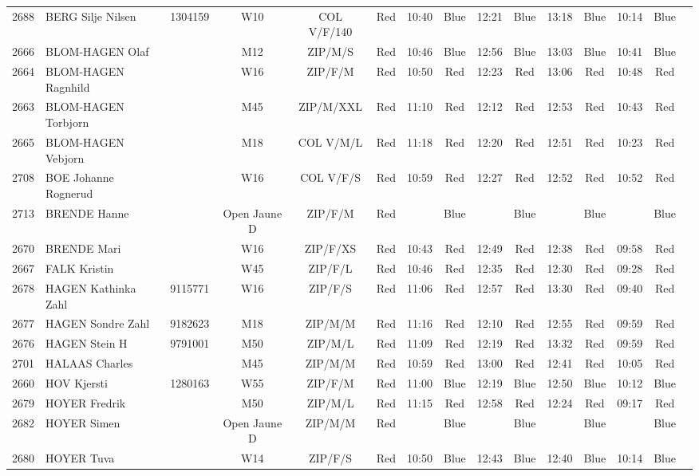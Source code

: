\documentclass{report}
\begin{document}
\begin{longtable}{|c|l|r|c|c|*{5}{cc|}}
    2688 & BERG Silje Nilsen & 1304159 & W10 & COL V/F/140 & Red & 10:40 & Blue & 12:21 & Blue & 13:18 & Blue & 10:14 & Blue &  \\
    2666 & BLOM-HAGEN Olaf &  & M12 & ZIP/M/S & Red & 10:46 & Blue & 12:56 & Blue & 13:03 & Blue & 10:41 & Blue &  \\
    2664 & BLOM-HAGEN Ragnhild &  & W16 & ZIP/F/M & Red & 10:50 & Red & 12:23 & Red & 13:06 & Red & 10:48 & Red &  \\
    2663 & BLOM-HAGEN Torbjorn &  & M45 & ZIP/M/XXL & Red & 11:10 & Red & 12:12 & Red & 12:53 & Red & 10:43 & Red &  \\
    2665 & BLOM-HAGEN Vebjorn &  & M18 & COL V/M/L & Red & 11:18 & Red & 12:20 & Red & 12:51 & Red & 10:23 & Red &  \\
    2708 & BOE Johanne Rognerud &  & W16 & COL V/F/S & Red & 10:59 & Red & 12:27 & Red & 12:52 & Red & 10:52 & Red &  \\
    2713 & BRENDE Hanne &  & Open Jaune D & ZIP/F/M & Red &   & Blue &   & Blue &   & Blue &   & Blue &  \\
    2670 & BRENDE Mari &  & W16 & ZIP/F/XS & Red & 10:43 & Red & 12:49 & Red & 12:38 & Red & 09:58 & Red &  \\
    2667 & FALK Kristin &  & W45 & ZIP/F/L & Red & 10:46 & Red & 12:35 & Red & 12:30 & Red & 09:28 & Red &  \\
    2678 & HAGEN Kathinka Zahl & 9115771 & W16 & ZIP/F/S & Red & 11:06 & Red & 12:57 & Red & 13:30 & Red & 09:40 & Red &  \\
    2677 & HAGEN Sondre Zahl & 9182623 & M18 & ZIP/M/M & Red & 11:16 & Red & 12:10 & Red & 12:55 & Red & 09:59 & Red &  \\
    2676 & HAGEN Stein H & 9791001 & M50 & ZIP/M/L & Red & 11:09 & Red & 12:19 & Red & 13:32 & Red & 09:59 & Red &  \\
    2701 & HALAAS Charles &  & M45 & ZIP/M/M & Red & 10:59 & Red & 13:00 & Red & 12:41 & Red & 10:05 & Red &  \\
    2660 & HOV Kjersti & 1280163 & W55 & ZIP/F/M & Red & 11:00 & Blue & 12:19 & Blue & 12:50 & Blue & 10:12 & Blue &  \\
    2679 & HOYER Fredrik &  & M50 & ZIP/M/L & Red & 11:15 & Red & 12:58 & Red & 12:24 & Red & 09:17 & Red &  \\
    2682 & HOYER Simen &  & Open Jaune D & ZIP/M/M & Red &   & Blue &   & Blue &   & Blue &   & Blue &  \\
    2680 & HOYER Tuva &  & W14 & ZIP/F/S & Red & 10:50 & Blue & 12:43 & Blue & 12:40 & Blue & 10:14 & Blue &  \\

\end{longtable}
\end{document}
